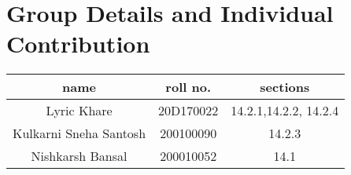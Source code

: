 \documentclass[11pt, twosides]{article}
\begin{document}
	\section{Group Details and Individual Contribution}
		\begin{table}[h]
		\centering
		\begin{tabular}{|c||c|c|}
			\hline
			name & roll no. & sections \\
			\hline
			Lyric Khare & 20D170022 & 14.2.1,14.2.2, 14.2.4\\
			\hline
			Kulkarni Sneha Santosh & 200100090& 14.2.3\\
			\hline
			Nishkarsh Bansal & 200010052 & 14.1\\
			\hline
		\end{tabular}
	\end{table}
\end{document}
